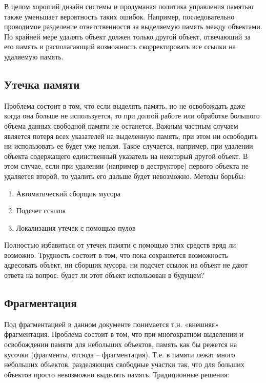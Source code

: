 \documentclass{article}
\begin{document}
В целом хороший дизайн системы и продуманая политика управления памятью также уменьшает вероятность таких ошибок. Например, последовательно проводимое разделение ответственности за выделяемую память между объектами.  По крайней мере удалять объект должен только другой объект, отвечающий за его память и располагающий возможность скорректировать все ссылки на удаляемую память.

\subsection{Утечка памяти}
Проблема состоит в том, что если выделять память, но не освобождать даже когда она больше не используется, то при долгой работе или обработке большого объема данных свободной памяти не останется. Важным частным случаем является потеря всех указателей на выделенную память, при этом ни освободить ни использовать ее будет уже нельзя. Такое случается, например, при удалении объекта содержащего единственный указатель на некоторый другой объект. В этом случае, если при удалении (например в деструкторе) первого объекта не удаляется второй, то удалить его дальше будет невозможно. Методы борьбы:

\begin{enumerate}
\item  Автоматический сборщик мусора

\item  Подсчет ссылок

\item  Локализация утечек с помощью пулов
\end{enumerate}

Полностью избавиться от утечек памяти с помощью этих средств вряд ли возможно. Трудность состоит в том, что пока сохраняется возможность адресовать объект, ни сборщик мусора, ни подсчет ссылок на объект не дают ответа на вопрос: будет ли этот объект использован в будущем?

\subsection{Фрагментация}
Под фрагментацией в данном документе понимается т.н. «внешняя» фрагментация. Проблема состоит в том, что при многократном выделении и освобождении памяти для небольших объектов, память как бы режется на кусочки (фрагменты, отсюда -- фрагментация). Т.е. в памяти лежат много небольших объектов, разделяющих свободные участки так, что для больших объектов просто невозможно выделять память. Традиционные решения:
\end{document}

